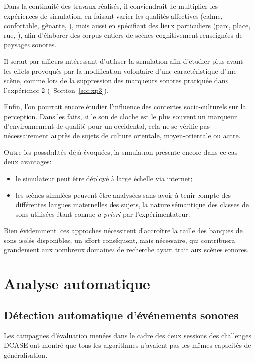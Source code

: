 Dans la continuité des travaux réalisés, il conviendrait de multiplier les expériences de simulation, en faisant varier les qualités affectives (calme, confortable, gênante, \etc), mais aussi en spécifiant des lieux particuliers (parc, place, rue, \etc), afin d'élaborer des corpus entiers de scènes cognitivement renseignées de paysages sonores. 

Il serait par ailleurs intéressant d'utiliser la simulation afin d'étudier plus avant les effets provoqués par la modification volontaire d'une caractéristique d'une scène, comme lors de la suppression des marqueurs sonores pratiquée dans l'expérience 2 (\cf~Section~\ref{sec:xp3}).

Enfin, l'on pourrait encore étudier l'influence des contextes socio-culturels sur la perception. Dans les faits, si le son de cloche est le plus souvent un marqueur d'environnement de qualité pour un occidental, cela ne se vérifie pas nécessairement auprès de sujets de culture orientale, moyen-orientale ou autre. 

Outre les possibilités déjà évoquées, la simulation présente encore dans ce cas deux avantages:

\begin{itemize}
\item le simulateur peut être déployé à large échelle via internet;
\item les scènes simulées peuvent être analysées sans avoir à tenir compte des différentes langues maternelles des sujets, la nature sémantique des classes de sons utilisées étant connue \emph{a priori} par l'expérimentateur.
\end{itemize}

Bien évidemment, ces approches nécessitent d'accroître la taille des banques de sons isolés disponibles, un effort conséquent, mais nécessaire, qui contribuera grandement aux nombreux domaines de recherche ayant trait aux scènes sonores.

\section{Analyse automatique}

\subsection{Détection automatique d'événements sonores}

Les campagnes d'évaluation menées dans le cadre des deux sessions des challenges DCASE ont montré que tous les algorithmes n'avaient pas les mêmes capacités de généralisation.

